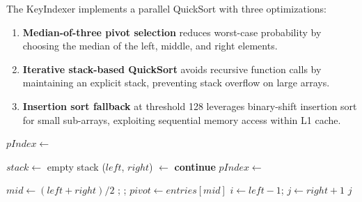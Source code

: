 \documentclass[conference]{IEEEtran}
\begin{document}
The KeyIndexer implements a parallel QuickSort with three optimizations:

\begin{enumerate}[leftmargin=*,nosep]
    \item \textbf{Median-of-three pivot selection} reduces worst-case probability by choosing the median of the left, middle, and right elements.
    \item \textbf{Iterative stack-based QuickSort} avoids recursive function calls by maintaining an explicit stack, preventing stack overflow on large arrays.
    \item \textbf{Insertion sort fallback} at threshold 128 leverages binary-shift insertion sort for small sub-arrays, exploiting sequential memory access within L1 cache.
\end{enumerate}

\begin{algorithm}[htbp]
    \caption{Hybrid Parallel QuickSort (KeyIndexer)}
    \label{alg:quicksort}
    \begin{algorithmic}[1]
             \Return \EndIf
            \State {}
        \EndProcedure

                \State {}
                \State \Return
            \EndIf
            \State $pIndex \gets$ 
            \State {}
        \EndProcedure

            \State $stack \gets$ empty stack
            \State {}
                \State ($left$, $right$) $\gets$ 
                    \State {}
                    \State \textbf{continue}
                \EndIf
                \State $pIndex \gets$ 
                \State {}
            \EndWhile
        \EndProcedure

            \State $mid \gets (left + right) / 2$
            \State {}; ; 
            \State $pivot \gets entries[mid]$
            \State $i \gets left - 1$; $j \gets right + 1$
            \Loop
                \EndWhile
                \EndWhile
                 \Return $j$ \EndIf
                \State {}
            \EndLoop
        \EndProcedure
    \end{algorithmic}
\end{algorithm}
\end{document}
